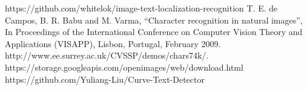 \documentclass[conference]{IEEEtran}
\begin{document}

\begin{thebibliography}{00}
 https://github.com/whitelok/image-text-localization-recognition
 T. E. de Campos, B. R. Babu and M. Varma, ``Character recognition in natural images'', In Proceedings of the International Conference on Computer Vision Theory and Applications (VISAPP), Lisbon, Portugal, February 2009. http://www.ee.surrey.ac.uk/CVSSP/demos/chars74k/.
 https://storage.googleapis.com/openimages/web/download.html
 https://github.com/Yuliang-Liu/Curve-Text-Detector
\end{thebibliography}
\end{document}

